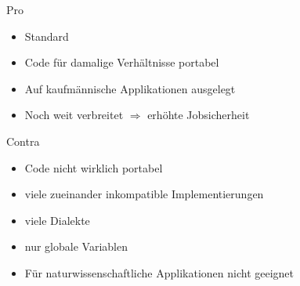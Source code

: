 \begin{slide}{Pro}
	\begin{itemize}
		\item{Standard}
		\item{Code für damalige Verhältnisse portabel}
		\item{Auf kaufmännische Applikationen ausgelegt}
		\item{Noch weit verbreitet $\Rightarrow$ erhöhte Jobsicherheit}
	\end{itemize}
\end{slide}


\begin{slide}{Contra}
	\begin{itemize}
		\item{Code nicht wirklich portabel}
		\item{viele zueinander inkompatible Implementierungen}
		\item{viele Dialekte}
		\item{nur globale Variablen}
		\item{Für naturwissenschaftliche Applikationen nicht geeignet}
	\end{itemize}
\end{slide}
